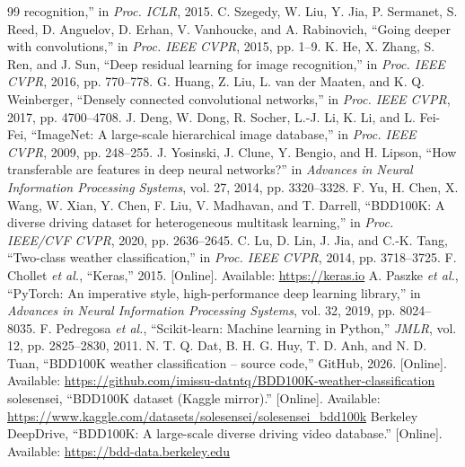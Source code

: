 \documentclass[12pt,letterpaper]{article}
\begin{document}
\begin{thebibliography}{99}
  recognition,'' in \emph{Proc. ICLR}, 2015.
 C. Szegedy, W. Liu, Y. Jia, P. Sermanet, S. Reed, D. Anguelov, D. Erhan, V. Vanhoucke, and
  A. Rabinovich, ``Going deeper with convolutions,'' in \emph{Proc. IEEE CVPR}, 2015, pp. 1--9.
 K. He, X. Zhang, S. Ren, and J. Sun, ``Deep residual learning for image recognition,'' in
  \emph{Proc. IEEE CVPR}, 2016, pp. 770--778.
 G. Huang, Z. Liu, L. van der Maaten, and K. Q. Weinberger, ``Densely connected convolutional
  networks,'' in \emph{Proc. IEEE CVPR}, 2017, pp. 4700--4708.
 J. Deng, W. Dong, R. Socher, L.-J. Li, K. Li, and L. Fei-Fei, ``ImageNet: A large-scale
  hierarchical image database,'' in \emph{Proc. IEEE CVPR}, 2009, pp. 248--255.
 J. Yosinski, J. Clune, Y. Bengio, and H. Lipson, ``How transferable are features in deep
  neural networks?'' in \emph{Advances in Neural Information Processing Systems}, vol. 27, 2014, pp. 3320--3328.
 F. Yu, H. Chen, X. Wang, W. Xian, Y. Chen, F. Liu, V. Madhavan, and T. Darrell, ``BDD100K: A
  diverse driving dataset for heterogeneous multitask learning,'' in \emph{Proc. IEEE/CVF CVPR}, 2020,
  pp. 2636--2645.
 C. Lu, D. Lin, J. Jia, and C.-K. Tang, ``Two-class weather classification,'' in \emph{Proc. IEEE
  CVPR}, 2014, pp. 3718--3725.
 F. Chollet \emph{et al.}, ``Keras,'' 2015. [Online]. Available: \url{https://keras.io}
 A. Paszke \emph{et al.}, ``PyTorch: An imperative style, high-performance deep learning
  library,'' in \emph{Advances in Neural Information Processing Systems}, vol. 32, 2019, pp. 8024--8035.
 F. Pedregosa \emph{et al.}, ``Scikit-learn: Machine learning in Python,'' \emph{JMLR},
  vol. 12, pp. 2825--2830, 2011.
 N. T. Q. Dat, B. H. G. Huy, T. D. Anh, and N. D. Tuan, ``BDD100K weather classification -- source
  code,'' GitHub, 2026. [Online]. Available:
  \url{https://github.com/imissu-datntq/BDD100K-weather-classification}
 solesensei, ``BDD100K dataset (Kaggle mirror).'' [Online]. Available:
  \url{https://www.kaggle.com/datasets/solesensei/solesensei_bdd100k}
 Berkeley DeepDrive, ``BDD100K: A large-scale diverse driving video database.'' [Online]. Available:
  \url{https://bdd-data.berkeley.edu}
\end{thebibliography}
\end{document}
